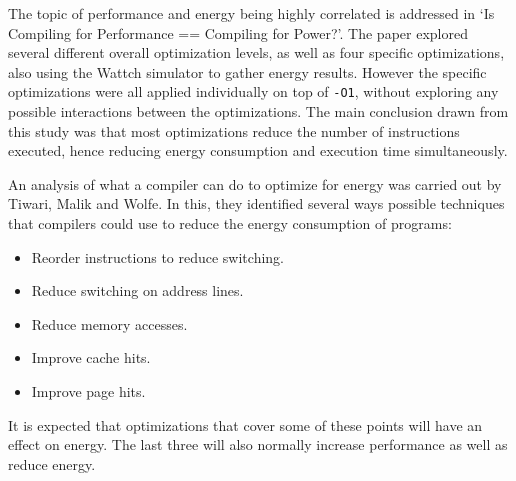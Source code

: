 \documentclass[twocolumn]{article}
\begin{document}
The topic of performance and energy being highly correlated is addressed in `Is Compiling for Performance == Compiling for Power?'\cite{CompilingForPerformancePower}. The paper explored several different overall optimization levels, as well as four specific optimizations, also using the Wattch simulator to gather energy results. However the specific optimizations were all applied individually on top of \texttt{-O1}, without exploring any possible interactions between the optimizations. The main conclusion drawn from this study was that most optimizations reduce the number of instructions executed, hence reducing energy consumption and execution time simultaneously.

An analysis of what a compiler can do to optimize for energy was carried out by Tiwari, Malik and Wolfe\cite{CompilationTechniquesForLowEnergy}. In this, they identified several ways possible techniques that compilers could use to reduce the energy consumption of programs:
\begin{itemize}
	\setlength{\itemsep}{0em}
	\vspace{-1mm}

	\item Reorder instructions to reduce switching.
	\item Reduce switching on address lines.
	\item Reduce memory accesses.
	\item Improve cache hits.
	\item Improve page hits.
\end{itemize}

It is expected that optimizations that cover some of these points will have an effect on energy. The last three will also normally increase performance as well as reduce energy.
\end{document}
